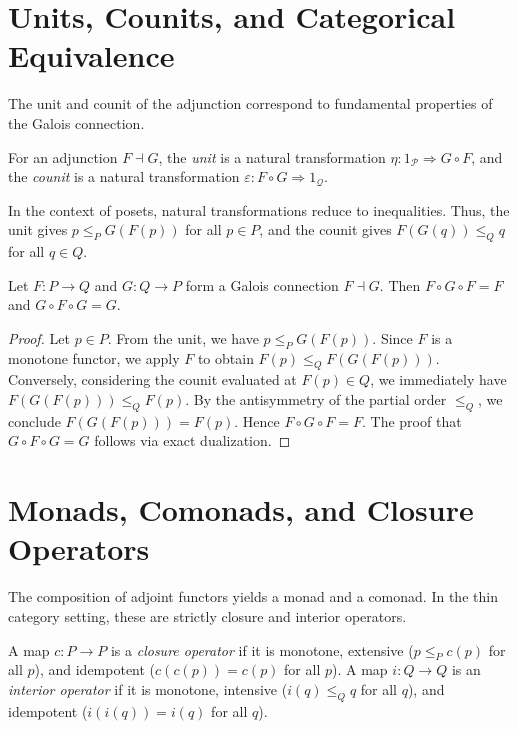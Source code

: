 \section{Units, Counits, and Categorical Equivalence}
The unit and counit of the adjunction correspond to fundamental properties of the Galois connection.
\begin{definition}
For an adjunction $F \dashv G$, the \emph{unit} is a natural transformation $\eta: 1_{\mathcal{P}} \Rightarrow G \circ F$, and the \emph{counit} is a natural transformation $\varepsilon: F \circ G \Rightarrow 1_{\mathcal{Q}}$.
\end{definition}

In the context of posets, natural transformations reduce to inequalities. Thus, the unit gives $p \leq_P G(F(p))$ for all $p \in P$, and the counit gives $F(G(q)) \leq_Q q$ for all $q \in Q$.

\begin{theorem}
Let $F: P \to Q$ and $G: Q \to P$ form a Galois connection $F \dashv G$. Then $F \circ G \circ F = F$ and $G \circ F \circ G = G$.
\end{theorem}
\begin{proof}
Let $p \in P$. From the unit, we have $p \leq_P G(F(p))$. Since $F$ is a monotone functor, we apply $F$ to obtain $F(p) \leq_Q F(G(F(p)))$.
Conversely, considering the counit evaluated at $F(p) \in Q$, we immediately have $F(G(F(p))) \leq_Q F(p)$.
By the antisymmetry of the partial order $\leq_Q$, we conclude $F(G(F(p))) = F(p)$. Hence $F \circ G \circ F = F$.
The proof that $G \circ F \circ G = G$ follows via exact dualization.
\end{proof}

\section{Monads, Comonads, and Closure Operators}
The composition of adjoint functors yields a monad and a comonad. In the thin category setting, these are strictly closure and interior operators.

\begin{definition}
A map $c: P \to P$ is a \emph{closure operator} if it is monotone, extensive ($p \leq_P c(p)$ for all $p$), and idempotent ($c(c(p)) = c(p)$ for all $p$).
A map $i: Q \to Q$ is an \emph{interior operator} if it is monotone, intensive ($i(q) \leq_Q q$ for all $q$), and idempotent ($i(i(q)) = i(q)$ for all $q$).
\end{definition}

